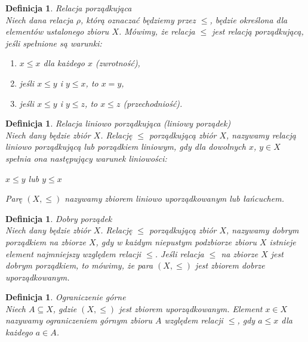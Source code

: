\documentclass[12pt,a4paper]{report}
\newtheorem{definition}[theorem]{Definicja}
\begin{document}
\begin{definition}{Relacja porządkująca \cite[Rozdział 1]{kuratowski2004}\\}
Niech dana relacja $\rho$, którą oznaczać będziemy przez $\leq$, będzie określona dla elementów ustalonego zbioru $X$. Mówimy, że relacja $\leq$ jest relacją porządkującą, jeśli spełnione są warunki:
\begin{enumerate}
\item $x \leq x$ dla każdego $x$ (zwrotność),
\item jeśli $x \leq y$ i $y \leq x$, to $x=y$,
\item jeśli $x \leq y$ i $y \leq z$, to $x \leq z$ (przechodniość).\\
\end{enumerate}
\end{definition}

\begin{definition}{Relacja liniowo porządkująca (liniowy porządek) \cite[Rozdział 2]{blaszczyk2007}\\}
Niech dany będzie zbiór $X$. Relację $\leq$ porządkującą zbiór $X$, nazywamy relacją liniowo porządkującą lub porządkiem liniowym, gdy dla dowolnych $x$, $y \in X$ spełnia ona następujący warunek liniowości:
\begin{center}
$x \leq y$ lub $y \leq x$
\end{center}
Parę $(X, \leq)$ nazywamy zbiorem liniowo uporządkowanym lub łańcuchem.\\
\end{definition}

\begin{definition}{Dobry porządek \cite[Rozdział 2]{blaszczyk2007}\\}
Niech dany będzie zbiór $X$. Relację $\leq$ porządkującą zbiór $X$, nazywamy dobrym porządkiem na zbiorze $X$, gdy w każdym niepustym podzbiorze zbioru $X$ istnieje element najmniejszy względem relacji $\leq$. Jeśli relacja $\leq$ na zbiorze $X$ jest dobrym porządkiem, to mówimy, że para $(X,\leq)$ jest zbiorem dobrze uporządkowanym.\\
\end{definition}

\begin{definition}{Ograniczenie górne \cite[Rozdział 2]{blaszczyk2007}\\}
Niech $A \subseteq X$, gdzie $(X, \leq)$ jest zbiorem uporządkowanym. Element $x \in X$ nazywamy ograniczeniem górnym zbioru $A$ względem relacji $\leq$, gdy $a \leq x$ dla każdego $a \in A$. \\
\end{definition}
\end{document}
